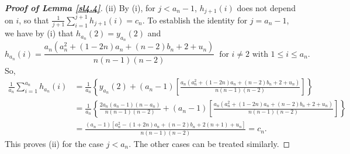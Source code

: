 \documentclass[12pt, A4paper, oneside]{article}
\theoremstyle{plain}
\numberwithin{equation}{section}
\begin{document}
\begin{proof}[\bf Proof of Lemma \ref{sl4.4}]
(ii) By (i), for $j<a_n-1$, $h_{j+1}(i)$ does not depend on $i$, so that $\frac{1}{j+1}\sum_{i=1}^{j+1}h_{j+1}(i)=c_n$.
To establish the identity for $j=a_n-1$, we have by (i) that $h_{a_n}(2)=y_{a_n}(2)$ and
$$
h_{a_n}(i)=\frac{a_n\left(a_n^2+(1-2n)a_n+(n-2)b_n+2+u_n\right)}{n(n-1)(n-2)}\;\;\mbox{for $i\neq2$ with $1\le i\le a_n$}.
$$
So,
\begin{align*}
\frac{1}{a_n}\sum_{i=1}^{a_n}h_{a_n}(i)&=\frac{1}{a_n}\left\{y_{a_n}(2)+(a_n-1)\left[\frac{a_n\left(a_n^2+(1-2n)a_n+(n-2)b_n+2+u_n\right)}{n(n-1)(n-2)}\right]\right\}\\
&=\frac{1}{a_n}\left\{\frac{2a_n(a_n-1)(n-a_n)}{n(n-1)(n-2)}+(a_n-1)\left[\frac{a_n\left(a_n^2+(1-2n)a_n+(n-2)b_n+2+u_n\right)}{n(n-1)(n-2)}\right]\right\}\\
&=\frac{(a_n-1)\left[a_n^2-(1+2n)a_n+(n-2)b_n+2(n+1)+u_n\right]}{n(n-1)(n-2)}=c_n.
\end{align*}
This proves (ii) for the case $j<a_n$. The other cases can be treated similarly.
\end{proof}
\end{document}
